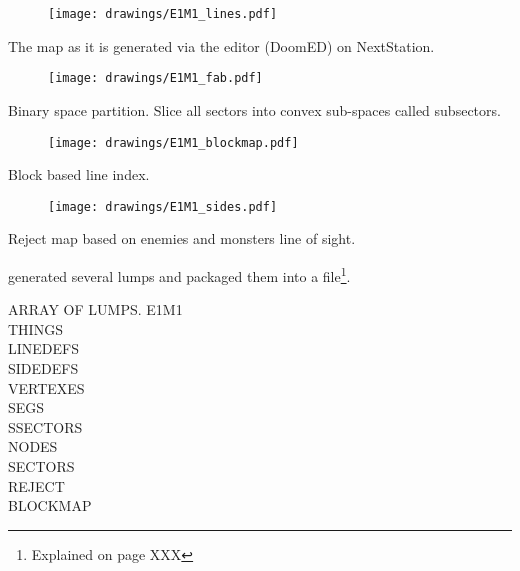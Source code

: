 \pagebreak
\par
\begin{figure}[H]
\centering
\texttt{[image: drawings/E1M1\_lines.pdf]}
\end{figure}
\par
The map as it is generated via the editor (DoomED) on NextStation.\\
\par
\begin{figure}[H]
\centering
\texttt{[image: drawings/E1M1\_fab.pdf]}
\end{figure}
\par
Binary space partition. Slice all sectors into convex sub-spaces called subsectors.\\
\par
\begin{figure}[H]
\centering
\texttt{[image: drawings/E1M1\_blockmap.pdf]}
\end{figure}
\par
Block based line index.\\
\par
\begin{figure}[H]
\centering
\texttt{[image: drawings/E1M1\_sides.pdf]}
\end{figure}
\par
Reject map based on enemies and monsters line of sight.\\


\pagebreak
{}
\par
{} generated several lumps and packaged them into a  file\footnote{Explained on page XXX}.
\par
ARRAY OF LUMPS.
E1M1\\
THINGS\\
LINEDEFS\\
SIDEDEFS\\
VERTEXES\\
SEGS\\
SSECTORS\\
NODES\\
SECTORS\\
REJECT\\
BLOCKMAP\\
\par
{}
\par

